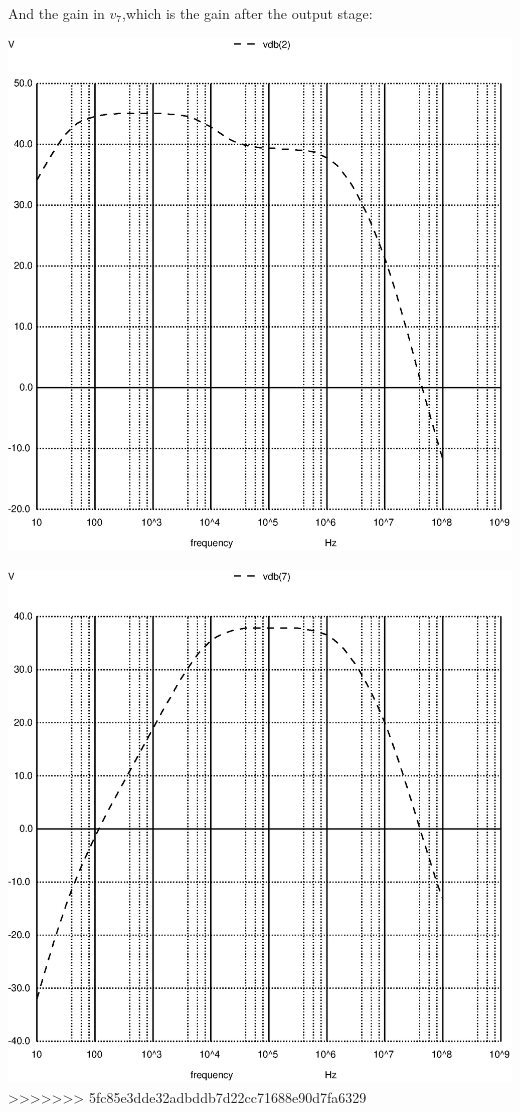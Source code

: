 And the gain in $v_7$,which is the gain after the output stage:

\includegraphics[width=1\linewidth]{../sim/vo1f.ps}

\includegraphics[width=1\linewidth]{../sim/vo2f.ps}
>>>>>>> 5fc85e3dde32adbddb7d22cc71688e90d7fa6329

